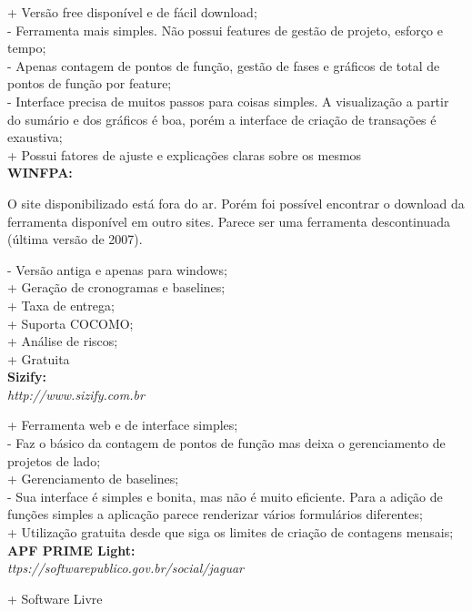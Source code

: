 \begin{apendicesenv}
\noindent + Versão free disponível e de fácil download;\\
- Ferramenta mais simples. Não possui features de gestão de projeto, esforço e tempo;\\
- Apenas contagem de pontos de função, gestão de fases e gráficos de total de pontos de função por feature;\\
- Interface precisa de muitos passos para coisas simples. A visualização a partir do sumário e dos gráficos é boa, porém a interface de criação de transações é exaustiva;\\
+ Possui fatores de ajuste e explicações claras sobre os mesmos\\

\noindent\textbf{WINFPA:}

O site disponibilizado está fora do ar. Porém foi possível encontrar o download da ferramenta disponível em outro sites. Parece ser uma ferramenta descontinuada (última versão de 2007).

\noindent- Versão antiga e apenas para windows;\\
+ Geração de cronogramas e baselines;\\
+ Taxa de entrega;\\
+ Suporta COCOMO;\\
+ Análise de riscos;\\
+ Gratuita\\

\noindent\textbf{Sizify:}\\
\textit{http://www.sizify.com.br}

\noindent + Ferramenta web e de interface simples;\\
- Faz o básico da contagem de pontos de função mas deixa o gerenciamento de projetos de lado;\\
+ Gerenciamento de baselines;\\
- Sua interface é simples e bonita, mas não é muito eficiente. Para a adição de funções simples a aplicação parece renderizar vários formulários diferentes;\\
+ Utilização gratuita desde que siga os limites de criação de contagens mensais;\\

\noindent\textbf{APF PRIME Light:}\\
\textit{ttps://softwarepublico.gov.br/social/jaguar}

\noindent + Software Livre

\end{apendicesenv}
